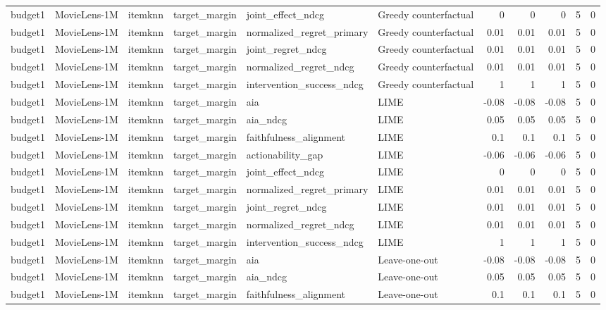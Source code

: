 \begin{table}[t]
{\begin{tabular}{llllllrrrrr}
budget1 & MovieLens-1M & itemknn & target\_margin & joint\_effect\_ndcg & Greedy counterfactual & 0 & 0 & 0 & 5 & 0 \\
budget1 & MovieLens-1M & itemknn & target\_margin & normalized\_regret\_primary & Greedy counterfactual & 0.01 & 0.01 & 0.01 & 5 & 0 \\
budget1 & MovieLens-1M & itemknn & target\_margin & joint\_regret\_ndcg & Greedy counterfactual & 0.01 & 0.01 & 0.01 & 5 & 0 \\
budget1 & MovieLens-1M & itemknn & target\_margin & normalized\_regret\_ndcg & Greedy counterfactual & 0.01 & 0.01 & 0.01 & 5 & 0 \\
budget1 & MovieLens-1M & itemknn & target\_margin & intervention\_success\_ndcg & Greedy counterfactual & 1 & 1 & 1 & 5 & 0 \\
budget1 & MovieLens-1M & itemknn & target\_margin & aia & LIME & -0.08 & -0.08 & -0.08 & 5 & 0 \\
budget1 & MovieLens-1M & itemknn & target\_margin & aia\_ndcg & LIME & 0.05 & 0.05 & 0.05 & 5 & 0 \\
budget1 & MovieLens-1M & itemknn & target\_margin & faithfulness\_alignment & LIME & 0.1 & 0.1 & 0.1 & 5 & 0 \\
budget1 & MovieLens-1M & itemknn & target\_margin & actionability\_gap & LIME & -0.06 & -0.06 & -0.06 & 5 & 0 \\
budget1 & MovieLens-1M & itemknn & target\_margin & joint\_effect\_ndcg & LIME & 0 & 0 & 0 & 5 & 0 \\
budget1 & MovieLens-1M & itemknn & target\_margin & normalized\_regret\_primary & LIME & 0.01 & 0.01 & 0.01 & 5 & 0 \\
budget1 & MovieLens-1M & itemknn & target\_margin & joint\_regret\_ndcg & LIME & 0.01 & 0.01 & 0.01 & 5 & 0 \\
budget1 & MovieLens-1M & itemknn & target\_margin & normalized\_regret\_ndcg & LIME & 0.01 & 0.01 & 0.01 & 5 & 0 \\
budget1 & MovieLens-1M & itemknn & target\_margin & intervention\_success\_ndcg & LIME & 1 & 1 & 1 & 5 & 0 \\
budget1 & MovieLens-1M & itemknn & target\_margin & aia & Leave-one-out & -0.08 & -0.08 & -0.08 & 5 & 0 \\
budget1 & MovieLens-1M & itemknn & target\_margin & aia\_ndcg & Leave-one-out & 0.05 & 0.05 & 0.05 & 5 & 0 \\
budget1 & MovieLens-1M & itemknn & target\_margin & faithfulness\_alignment & Leave-one-out & 0.1 & 0.1 & 0.1 & 5 & 0 \\

\end{tabular}}
\end{table}
